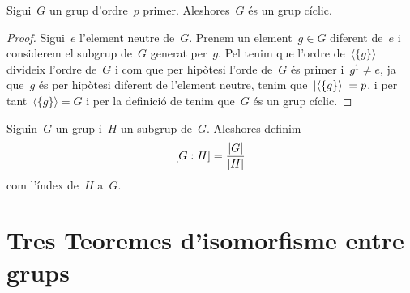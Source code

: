 \documentclass[../../main.tex]{subfiles}
\begin{document}
	\begin{corollary} %
		Sigui~\(G\) un grup d'ordre~\(p\) primer.
		Aleshores~\(G\) és un grup cíclic.
		\begin{proof}
			Sigui~\(e\) l'element neutre de~\(G\).
			Prenem un element~\(g\in G\) diferent de~\(e\) i considerem el subgrup de~\(G\) generat per~\(g\).
			Pel  tenim que l'ordre de~\(\langle\{g\}\rangle\) divideix l'ordre de~\(G\) i com que per hipòtesi l'orde de~\(G\) és primer i~\(g^{1}\neq e\), ja que~\(g\) és per hipòtesi diferent de l'element neutre, tenim que~\(\abs{\langle\{g\}\rangle}=p\), i per tant~\(\langle\{g\}\rangle=G\) i per la definició de  tenim que~\(G\) és un grup cíclic.
		\end{proof}
	\end{corollary}
	\begin{definition}
		\label{def:l'índex d'un subgrup en un grup}
		Siguin~\(G\) un grup i~\(H\) un subgrup de~\(G\).
		Aleshores definim
		\[
		    [G:H]=\frac{\abs{G}}{\abs{H}}
		\]
		com l'índex de~\(H\) a~\(G\).
	\end{definition}
\section{Tres Teoremes d'isomorfisme entre grups}
\end{document}
